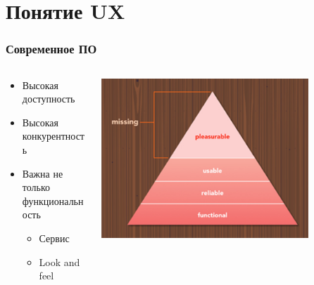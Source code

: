 \documentclass{../../slides-style}
\begin{document}
    \begin{frame}[plain]
        \titlepage
    \end{frame}

    \section{Понятие UX}

    \begin{frame}
        \frametitle{Современное ПО}
        \begin{columns}
            \begin{column}{0.5\textwidth}
                \begin{itemize}
                    \item Высокая доступность
                    \item Высокая конкурентность
                    \item Важна не только функциональность
                    \begin{itemize}
                        \item Сервис
                        \item Look and feel
                    \end{itemize}
                \end{itemize}
            \end{column}
            \begin{column}{0.5\textwidth}
                \begin{center}
                    \includegraphics[width=0.8\textwidth]{uxPyramid.png}
                \end{center}
            \end{column}
        \end{columns}
    \end{frame}
\end{document}
